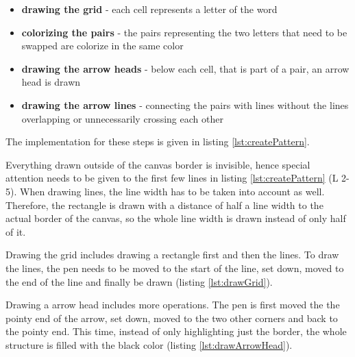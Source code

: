 \begin{itemize}
  \item \textbf{drawing the grid} - each cell represents a letter of the word
  \item \textbf{colorizing the pairs} - the pairs representing the two letters that need to be swapped are colorize in the same color
  \item \textbf{drawing the arrow heads} - below each cell, that is part of a pair, an arrow head is drawn
  \item \textbf{drawing the arrow lines} - connecting the pairs with lines without the lines overlapping or unnecessarily crossing each other
\end{itemize}

The implementation for these steps is given in listing \ref{lst:createPattern}.

Everything drawn outside of the canvas border is invisible, hence special attention needs to be given to the first few lines in listing \ref{lst:createPattern} (L 2-5). When drawing lines, the line width has to be taken into account as well. Therefore, the rectangle is drawn with a distance of half a line width to the actual border of the canvas, so the whole line width is drawn instead of only half of it. 

Drawing the grid includes drawing a rectangle first and  then the lines. To draw the lines, the pen needs to be moved to the start of the line, set down, moved to the end of the line and finally be drawn (listing \ref{lst:drawGrid}). 

Drawing a arrow head includes more operations. The pen is first moved the the pointy end of the arrow, set down, moved to the two other corners and back to the pointy end. This time, instead of only highlighting just the border, the whole structure is filled with the black color (listing \ref{lst:drawArrowHead}).

